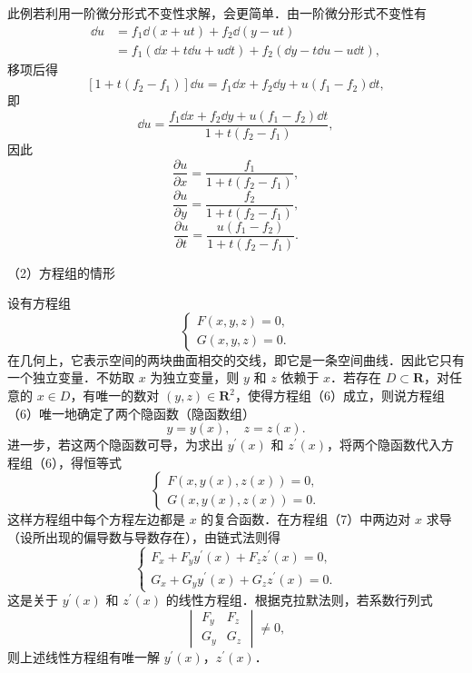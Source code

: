 此例若利用一阶微分形式不变性求解，会更简单．由一阶微分形式不变性有
\[
\begin{aligned}
\dd u&=f_{1}\dd(x+ut)+f_{2}\dd(y-ut)\\
&=f_{1}(\dd x+t\dd u+u\dd t)+f_{2}(\dd y-t\dd u-u\dd t),
\end{aligned}
\]
移项后得
\[
[1+t(f_{2}-f_{1})]\dd u=f_{1}\dd x+f_{2}\dd y+u(f_{1}-f_{2})\dd t,
\]
即
\[
\dd u=\frac{f_{1}\dd x+f_{2}\dd y+u(f_{1}-f_{2})\dd t}{1+t(f_{2}-f_{1})},
\]
因此
\[
\frac{\partial u}{\partial x}=\frac{f_{1}}{1+t(f_{2}-f_{1})},
\]
\[
\frac{\partial u}{\partial y}=\frac{f_{2}}{1+t(f_{2}-f_{1})},
\]
\[
\frac{\partial u}{\partial t}=\frac{u(f_{1}-f_{2})}{1+t(f_{2}-f_{1})}.
\]

（2）方程组的情形

设有方程组
\begin{equation}
\begin{cases}
F(x,y,z)=0,\\
G(x,y,z)=0.
\end{cases}
\tag{6}
\end{equation}
在几何上，它表示空间的两块曲面相交的交线，即它是一条空间曲线．因此它只有一个独立变量．不妨取 $x$ 为独立变量，则 $y$ 和 $z$ 依赖于 $x$．若存在 $D\subset\mathbf{R}$，对任意的 $x\in D$，有唯一的数对 $(y,z)\in\mathbf{R}^{2}$，使得方程组（6）成立，则说方程组（6）唯一地确定了两个隐函数（隐函数组）
\[
y=y(x),\quad z=z(x).
\]
进一步，若这两个隐函数可导，为求出 $y^{\prime}(x)$ 和 $z^{\prime}(x)$，将两个隐函数代入方程组（6），得恒等式
\begin{equation}
\begin{cases}
F(x,y(x),z(x))=0,\\
G(x,y(x),z(x))=0.
\end{cases}
\tag{7}
\end{equation}
这样方程组中每个方程左边都是 $x$ 的复合函数．在方程组（7）中两边对 $x$ 求导（设所出现的偏导数与导数存在），由链式法则得
\[
\begin{cases}
F_{x}+F_{y}y^{\prime}(x)+F_{z}z^{\prime}(x)=0,\\
G_{x}+G_{y}y^{\prime}(x)+G_{z}z^{\prime}(x)=0.
\end{cases}
\]
这是关于 $y^{\prime}(x)$ 和 $z^{\prime}(x)$ 的线性方程组．根据克拉默法则，若系数行列式
\[
\begin{vmatrix}F_{y}&F_{z}\\ G_{y}&G_{z}\end{vmatrix}\neq 0,
\]
则上述线性方程组有唯一解 $y^{\prime}(x)$，$z^{\prime}(x)$．

